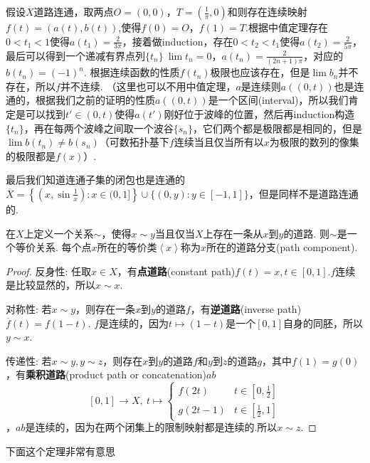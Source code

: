 假设$X$道路连通，取两点$O=(0,0)$，$T=(\frac{1}{\pi},0)$和则存在连续映射$f(t)=(a(t),b(t))$,使得$f(0)=O$，$f(1)=T$.根据中值定理存在$0<t_1<1$使得$a(t_1)=\frac{2}{3\pi}$，接着做induction，存在$0<t_2<t_1$使得$a(t_2) = \frac{2}{5\pi}$，最后可以得到一个递减有界点列$\{t_n\} \ \lim t_n = 0$，$a(t_n) = \frac{2}{(2n+1)\pi}$，对应的$b(t_n)=(-1)^n$. 根据连续函数的性质${f(t_n)}$极限也应该存在，但是$\lim b_n$并不存在，所以$f$并不连续. （这里也可以不用中值定理，$a$是连续则$a((0,t))$也是连通的，根据我们之前的证明的性质$a((0,t))$是一个区间\rm(interval)，所以我们肯定是可以找到$t' \in (0,t)$使得$a(t')$刚好位于波峰的位置，然后再induction构造$\{t_n\}$，再在每两个波峰之间取一个波谷$\{s_n\}$，它们两个都是极限都是相同的，但是$\lim b(t_n) \neq b(s_n)$（可数拓扑基下$f$连续当且仅当所有以$x$为极限的数列的像集的极限都是$f(x)$）.


最后我们知道连通子集的闭包也是连通的$\overline{X} = \left\{  \left( x, \sin \tfrac{1}{x}  \right ) :  x \in (0,1] \right\} \cup \{(0,y) : y \in [-1,1]\}$，但是同样不是道路连通的.

\begin{proposition}
在$X$上定义一个关系$\sim$，使得$x \sim y$当且仅当$X$上存在一条从$x$到$y$的道路. 则$\sim$是一个等价关系. 每个点$x$所在的等价类$\left<x \right>$称为$x$所在的道路分支(path component).
\end{proposition}

\begin{proof}
反身性: 任取$x \in X$，有\textbf{点道路}(constant path)$f(t) = x,t \in [0,1]$.$f$连续是比较显然的，所以$x \sim x$.

对称性: 若$x \sim y$，则存在一条$x$到$y$的道路$f$，有\textbf{逆道路}(inverse path)$\overline{f}(t)=f(1-t)$. $f$是连续的，因为$t \mapsto (1-t)$是一个$[0,1]$自身的同胚，所以$y \sim x$.

传递性: 若$x \sim y, y \sim z$，则存在$x$到$y$的道路$f$和$y$到$z$的道路$g$，其中$f(1) = g(0)$，有\textbf{乘积道路}(product path or concatenation)$ab$ \[[0,1]\rightarrow X, \ t \mapsto \begin{cases} f(2t) & t \in [0,\frac{1}{2}] \\ g(2t-1) & t \in [\frac{1}{2},1] \end{cases}\]，$ab$是连续的，因为在两个闭集上的限制映射都是连续的.所以$x \sim z$.
\end{proof}

下面这个定理非常有意思

